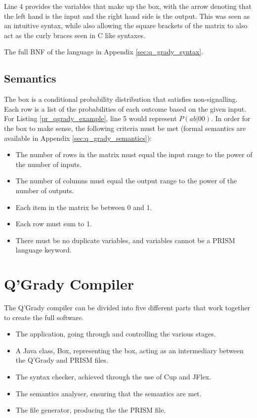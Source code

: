 \documentclass[report.tex]{subfiles}
\begin{document}
Line 4 provides the variables that make up the box, with the arrow denoting that
the left hand is the input and the right hand side is the output. This was seen
as an intuitive syntax, while also allowing the square brackets of the matrix to
also act as the curly braces seen in C like syntaxes.

The full BNF of the language in Appendix \ref{sec:q_grady_syntax}.

\subsection{Semantics} %
\label{sec:semantics}
The box is a conditional probability distribution that satisfies non-signalling.
Each row is a list of the probabilities of each outcome based on the given
input. For Listing \ref{pr_qgrady_example}, line 5 would represent 
\(P(ab | 00)\). In order for the box to make sense, the following criteria must
be met (formal semantics are available in Appendix \ref{sec:q_grady_semantics}):
\begin{itemize}
    \item The number of rows in the matrix must equal the input range to the
    power of the number of inputs.
    \item The number of columns must equal the output range to the power of the
    number of outputs.
    \item Each item in the matrix be between 0 and 1.
    \item Each row must sum to 1.
    \item There must be no duplicate variables, and variables cannot be a PRISM
    language keyword.
\end{itemize}


\section{Q'Grady Compiler} %
\label{sec:q_grady_compiler}
The Q'Grady compiler can be divided into five different parts that work
together to create the full software.
\begin{itemize}
    \item The application, going through and controlling the various stages.
    \item A Java class, Box, representing the box, acting as an intermediary
    between the Q'Grady and PRISM files.
    \item The syntax checker, achieved through the use of Cup and JFlex.
    \item The semantics analyser, ensuring that the semantics are met.
    \item The file generator, producing the the PRISM file.
\end{itemize}
\end{document}
